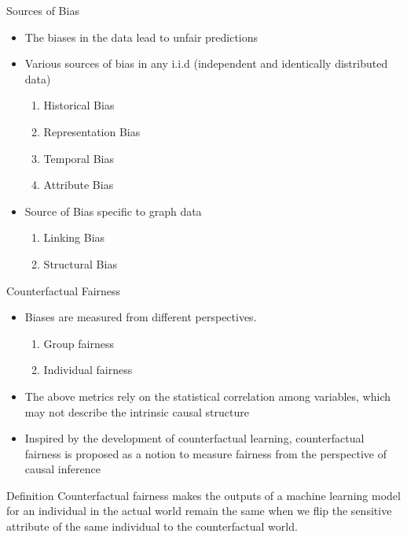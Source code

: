 \documentclass[aspectratio=169,xcolor=dvipsnames]{beamer}
\begin{document}
	\begin{frame}{Sources of Bias}
		\begin{itemize}
		\item	The biases in the data lead to unfair predictions
		\item Various sources of bias in any i.i.d (independent and identically distributed data)
			\begin{enumerate}
				\item Historical Bias
				\item Representation Bias
				\item Temporal Bias
				\item Attribute Bias				
			\end{enumerate}
			\item Source of Bias specific to graph data
			\begin{enumerate}
				\item Linking Bias
				\item Structural Bias
			\end{enumerate}
		\end{itemize}
		
	\end{frame}
	
	
	\begin{frame}{Counterfactual Fairness}
		
		\begin{itemize}
			\item Biases are measured from different perspectives. 
			\begin{enumerate}
				\item Group fairness 
				\item Individual fairness
			\end{enumerate}
			\item The above metrics rely on the statistical correlation among variables, which may not describe the intrinsic causal structure
			\item Inspired by the development of counterfactual learning, counterfactual fairness is proposed as a notion to measure fairness from the perspective of causal inference
		\end{itemize}
		\begin{block}{Definition}
			Counterfactual fairness makes the outputs of a machine learning model for an individual in the actual world remain the same when we flip the sensitive attribute of the same individual to the counterfactual world.
		\end{block}
		
		

	\end{frame}
	
\end{document}
